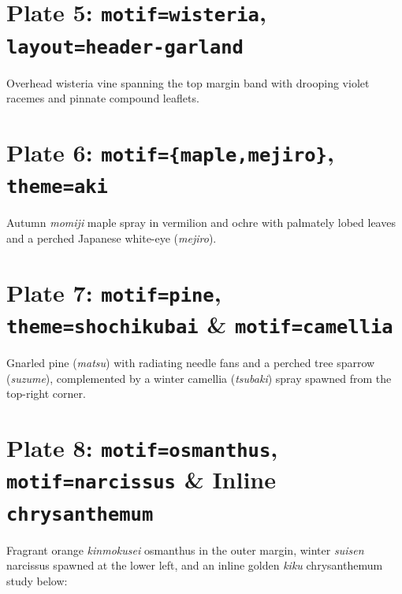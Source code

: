 \documentclass[11pt,a4paper,twoside]{article}
\begin{document}
\section*{Plate 5: \texttt{motif=wisteria}, \texttt{layout=header-garland}}
Overhead wisteria vine spanning the top margin band with drooping violet racemes and pinnate compound leaflets.
\clearpage

\section*{Plate 6: \texttt{motif=\{maple,mejiro\}}, \texttt{theme=aki}}
Autumn \emph{momiji} maple spray in vermilion and ochre with palmately lobed leaves and a perched Japanese white-eye (\emph{mejiro}).
\clearpage

\section*{Plate 7: \texttt{motif=pine}, \texttt{theme=shochikubai} \& \texttt{motif=camellia}}
Gnarled pine (\emph{matsu}) with radiating needle fans and a perched tree sparrow (\emph{suzume}), complemented by a winter camellia (\emph{tsubaki}) spray spawned from the top-right corner.
\clearpage

\section*{Plate 8: \texttt{motif=osmanthus}, \texttt{motif=narcissus} \& Inline \texttt{chrysanthemum}}
Fragrant orange \emph{kinmokusei} osmanthus in the outer margin, winter \emph{suisen} narcissus spawned at the lower left, and an inline golden \emph{kiku} chrysanthemum study below:

\bigskip
\begin{center}
\kachospray[width=0.72\linewidth, height=40mm, motif=chrysanthemum, seed=25, from=left]
\end{center}
\clearpage
\end{document}
